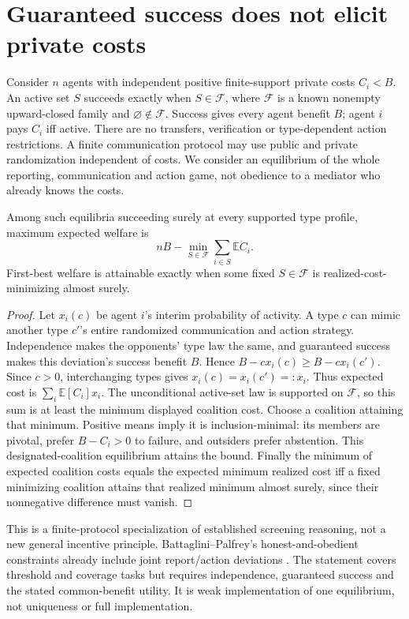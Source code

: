 \section{Guaranteed success does not elicit private costs}\label{sec:07-phase11-1}
Consider $n$ agents with independent positive finite-support private costs
$C_i<B$. An active set $S$ succeeds exactly when $S\in\mathcal F$, where
$\mathcal F$ is a known nonempty upward-closed family and
$\varnothing\notin\mathcal F$. Success gives every agent benefit $B$;
agent $i$ pays $C_i$ iff active. There are no transfers, verification or
type-dependent action restrictions. A finite communication protocol may use
public and private randomization independent of costs. We consider an equilibrium
of the whole reporting, communication and action game, not obedience to a
mediator who already knows the costs.

\begin{proposition}\label{result:07-phase11-1}
Among such equilibria succeeding surely at every supported type profile,
maximum expected welfare is
\[
 nB-\min_{S\in\mathcal F}\sum_{i\in S}\mathbb E C_i.
\]
First-best welfare is attainable exactly when some fixed $S\in\mathcal F$
is realized-cost-minimizing almost surely.
\end{proposition}
\begin{proof}
Let $x_i(c)$ be agent $i$'s interim probability of activity. A type $c$ can
mimic another type $c'$'s entire randomized communication and action strategy.
Independence makes the opponents' type law the same, and guaranteed success
makes this deviation's success benefit $B$. Hence
$B-cx_i(c)\ge B-cx_i(c')$. Since $c>0$, interchanging types gives
$x_i(c)=x_i(c')=:x_i$. Thus expected cost is
$\sum_i\mathbb E[C_i]x_i$. The unconditional active-set law is supported on
$\mathcal F$, so this sum is at least the minimum displayed coalition cost.
Choose a coalition attaining that minimum. Positive means imply it is
inclusion-minimal: its members are pivotal, prefer $B-C_i>0$ to failure,
and outsiders prefer abstention. This designated-coalition equilibrium attains
the bound. Finally the minimum of expected coalition costs equals the expected
minimum realized cost iff a fixed minimizing coalition attains that realized
minimum almost surely, since their nonnegative difference must vanish.
\end{proof}

This is a finite-protocol specialization of established screening reasoning,
not a new general incentive principle. Battaglini--Palfrey's honest-and-obedient
constraints already include joint report/action deviations \citep{battaglini2024}.
The statement covers threshold and coverage tasks but requires independence,
guaranteed success and the stated common-benefit utility. It is weak
implementation of one equilibrium, not uniqueness or full implementation.

